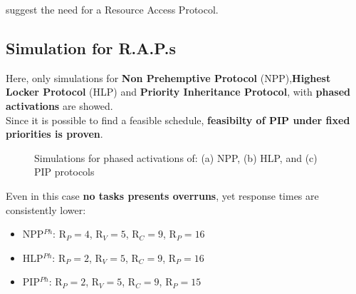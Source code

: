 \documentclass{article}
\begin{document}
suggest the need for a Resource Access Protocol.

\subsection{Simulation for R.A.P.s}                 \label{rap}

Here, only simulations for \textbf{Non Prehemptive Protocol} (NPP),\textbf{Highest Locker Protocol} (HLP) and \textbf{Priority Inheritance Protocol}, with \textbf{phased activations} are showed.\vspace{.3cm}\\
Since it is possible to find a feasible schedule, \textbf{feasibilty of PIP under fixed priorities is proven}.

\begin{figure}[H]                                       \label{fig_rap}
    \caption{Simulations for phased activations of: (a) NPP, (b) HLP, and (c) PIP protocols}
\end{figure}

Even in this case \textbf{no tasks presents overruns}, yet response times are consistently lower:

\begin{itemize}
    \item \begin{center}
            NPP$^{Ph}$: R$_{P}=4$, R$_{V}=5$, R$_{C}=9$, R$_{P}=16$
        \end{center}
    \item \begin{center}
            HLP$^{Ph}$: R$_{P}=2$, R$_{V}=5$, R$_{C}=9$, R$_{P}=16$
        \end{center}
    \item \begin{center}
            PIP$^{Ph}$: R$_{P}=2$, R$_{V}=5$, R$_{C}=9$, R$_{P}=15$
        \end{center}
\end{itemize}
\end{document}
